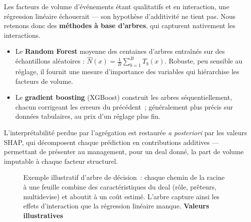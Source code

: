 Les facteurs de volume d'événements étant qualitatifs et en interaction, une régression linéaire échouerait --- son hypothèse d'additivité ne tient pas. Nous retenons donc des \textbf{méthodes à base d'arbres}, qui capturent nativement les interactions.

\begin{itemize}
    \item Le \textbf{Random Forest} moyenne des centaines d'arbres entraînés sur des échantillons aléatoires : $\hat{N}(x) = \frac{1}{B}\sum_{b=1}^{B} T_b(x)$. Robuste, peu sensible au réglage, il fournit une mesure d'importance des variables qui hiérarchise les facteurs de volume.
    \item Le \textbf{gradient boosting} (XGBoost) construit les arbres séquentiellement, chacun corrigeant les erreurs du précédent~; généralement plus précis sur données tabulaires, au prix d'un réglage plus fin.
\end{itemize}

L'interprétabilité perdue par l'agrégation est restaurée \emph{a posteriori} par les valeurs SHAP, qui décomposent chaque prédiction en contributions additives --- permettant de présenter au management, pour un deal donné, la part de volume imputable à chaque facteur structurel.


\begin{figure}[htbp]\centering
{}
\caption{Exemple illustratif d'arbre de décision~: chaque chemin de la racine à une feuille combine des caractéristiques du deal (rôle, prêteurs, multidevise) et aboutit à un coût estimé. L'arbre capture ainsi les effets d'interaction que la régression linéaire manque. \textbf{Valeurs illustratives}}
\label{fig:arbre-illustratif}
\end{figure}

